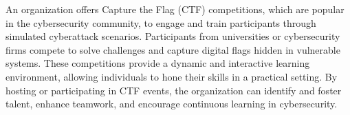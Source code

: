 An organization offers Capture the Flag (CTF) competitions, which are popular in the cybersecurity community, to engage and train participants through simulated cyberattack scenarios. Participants from universities or cybersecurity firms compete to solve challenges and capture digital flags hidden in vulnerable systems. These competitions provide a dynamic and interactive learning environment, allowing individuals to hone their skills in a practical setting. By hosting or participating in CTF events, the organization can identify and foster talent, enhance teamwork, and encourage continuous learning in cybersecurity.